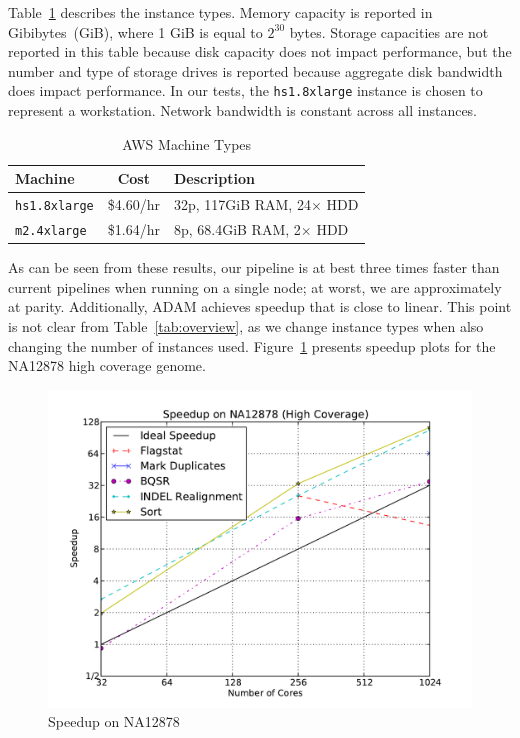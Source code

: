 \documentclass{acm_proc_article-sp}
\begin{document}
Table~\ref{tab:machines} describes the instance types. Memory capacity is reported in Gibibytes~(GiB),
where 1 GiB is equal to $2^{30}$ bytes. Storage capacities are not reported in this table because disk
capacity does not impact performance, but the number and type of storage drives is reported because
aggregate disk bandwidth does impact performance. In our tests, the \texttt{hs1.8xlarge} instance is
chosen to represent a workstation. Network bandwidth is constant across all instances.

\begin{table}[h]
\caption{AWS Machine Types}
\label{tab:machines}
\begin{tabular}{ l c l }
\hline
\bf Machine & \bf Cost & \bf Description \\
\hline
\hline
\texttt{hs1.8xlarge} & \$4.60/hr & 32p, 117GiB RAM, 24$\times$ HDD \\
\texttt{m2.4xlarge} & \$1.64/hr & 8p, 68.4GiB RAM, 2$\times$ HDD \\
\hline
\end{tabular}
\end{table}

As can be seen from these results, our pipeline is at best three times faster than current pipelines when running
on a single node; at worst, we are approximately at parity. Additionally, ADAM achieves speedup that is close to
linear. This point is not clear from Table~\ref{tab:overview}, as we change instance types when also changing the
number of instances used. Figure~\ref{fig:speedup} presents speedup plots for the NA12878 high coverage
genome.

\begin{figure}[h]
\begin{center}
\includegraphics[width=0.99\linewidth]{graphs/speedup_na12878.pdf}
\end{center}
\caption{Speedup on NA12878}
\label{fig:speedup}
\end{figure}
\end{document}
